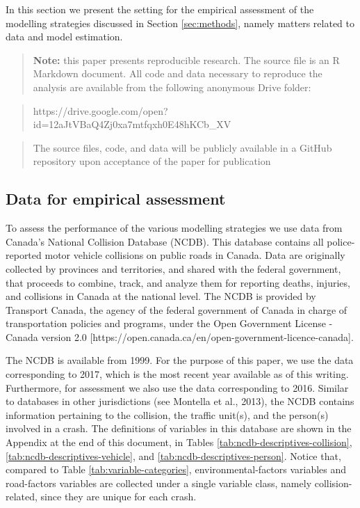 \documentclass[]{elsarticle} %
\begin{document}
In this section we present the setting for the empirical assessment of
the modelling strategies discussed in Section \ref{sec:methods}, namely
matters related to data and model estimation.

\begin{quote}
\textbf{Note:} this paper presents reproducible research. The source
file is an R Markdown document. All code and data necessary to reproduce
the analysis are available from the following anonymous Drive folder:
\end{quote}

\begin{quote}
https://drive.google.com/open?id=12aJtVBaQ4Zj0xa7mtfqxh0E48hKCb\_XV
\end{quote}

\begin{quote}
The source files, code, and data will be publicly available in a GitHub
repository upon acceptance of the paper for publication
\end{quote}

\hypertarget{sec:data}{%
\subsection{Data for empirical assessment}\label{sec:data}}

To assess the performance of the various modelling strategies we use
data from Canada's National Collision Database (NCDB). This database
contains all police-reported motor vehicle collisions on public roads in
Canada. Data are originally collected by provinces and territories, and
shared with the federal government, that proceeds to combine, track, and
analyze them for reporting deaths, injuries, and collisions in Canada at
the national level. The NCDB is provided by Transport Canada, the agency
of the federal government of Canada in charge of transportation policies
and programs, under the Open Government License - Canada version 2.0
{[}https://open.canada.ca/en/open-government-licence-canada{]}.

The NCDB is available from 1999. For the purpose of this paper, we use
the data corresponding to 2017, which is the most recent year available
as of this writing. Furthermore, for assessment we also use the data
corresponding to 2016. Similar to databases in other jurisdictions (see
Montella et al., 2013), the NCDB contains information pertaining to the
collision, the traffic unit(s), and the person(s) involved in a crash.
The definitions of variables in this database are shown in the Appendix
at the end of this document, in Tables
\ref{tab:ncdb-descriptives-collision},
\ref{tab:ncdb-descriptives-vehicle}, and
\ref{tab:ncdb-descriptives-person}. Notice that, compared to Table
\ref{tab:variable-categories}, environmental-factors variables and
road-factors variables are collected under a single variable class,
namely collision-related, since they are unique for each crash.
\end{document}
